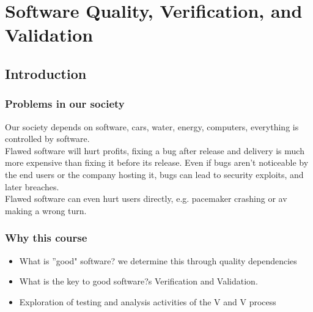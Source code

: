 \chapter{Software Quality, Verification, and Validation}
\section{Introduction}
\subsection{Problems in our society}
Our society depends on software, cars, water, energy, computers, everything is controlled by software.\\
Flawed software will hurt profits, fixing a bug after release and delivery is much more expensive than fixing it before its release. Even if bugs aren't noticeable by the end users or the company hosting it, bugs can lead to security exploits, and later breaches.\\
Flawed software can even hurt users directly, e.g. pacemaker crashing or av making a wrong turn.\\

\subsection{Why this course}
\begin{itemize}
	\item What is ''good" software?
	      \subitem we determine this through quality dependencies
	\item What is the key to good software?s
	      \subitem Verification and Validation.
	\item Exploration of testing and analysis activities of the V and V process
\end{itemize}
